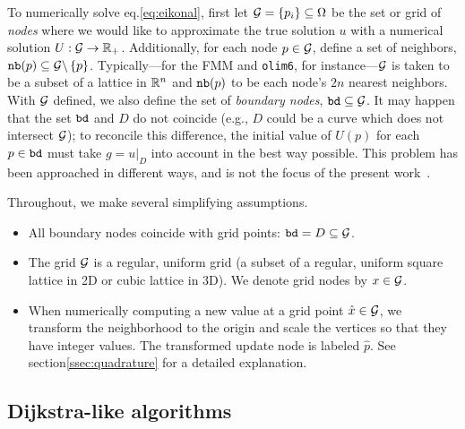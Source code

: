 \documentclass[smallcondensed]{svjour3}
\begin{document}
To numerically solve eq.\@ \ref{eq:eikonal}, first let
$\mathcal{G} = \{p_i\} \subseteq \Omega$ be the set or grid of \emph{nodes}
where we would like to approximate the true solution $u$ with a
numerical solution $U : \mathcal{G} \to \mathbb{R}_+$. Additionally, for each node
$p \in \mathcal{G}$, define a set of neighbors,
$\texttt{nb}(p) \subseteq \mathcal{G} \backslash \left\{p\right\}$. Typically---for the FMM
and \texttt{olim6}, for instance---$\mathcal{G}$ is taken to be a subset of
a lattice in $\mathbb{R}^n$ and $\texttt{nb}(p)$ to be each node's $2n$ nearest
neighbors. With $\mathcal{G}$ defined, we also define the set of
\emph{boundary nodes}, $\texttt{bd} \subseteq \mathcal{G}$. It may happen that
the set $\texttt{bd}$ and $D$ do not coincide (e.g., $D$ could be a
curve which does not intersect $\mathcal{G}$); to reconcile this difference,
the initial value of $U(p)$ for each $p \in \texttt{bd}$ must take
$g = \left. u \right|_D$ into account in the best way possible. This
problem has been approached in different ways, and is not the focus of
the present work~\cite{chopp2001some}.

Throughout, we make several simplifying assumptions.
\begin{itemize}
\item All boundary nodes coincide with grid points:
  $\texttt{bd} = D \subseteq \mathcal{G}$.
\item The grid $\mathcal{G}$ is a regular, uniform grid (a subset of a
  regular, uniform square lattice in 2D or cubic lattice in 3D). We
  denote grid nodes by $x \in \mathcal{G}$.
\item When numerically computing a new value at a grid point
  $\hat{x} \in \mathcal{G}$, we transform the neighborhood to the origin and
  scale the vertices so that they have integer values. The transformed
  update node is labeled $\hat{p}$. See section\@ \ref{ssec:quadrature}
  for a detailed explanation.
\end{itemize}

\subsection{Dijkstra-like algorithms}\label{ssec:dijkstra-like}
\end{document}
